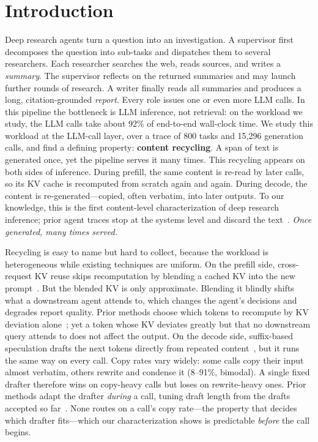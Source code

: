 \section{Introduction}

Deep research agents turn a question into an investigation. A supervisor first decomposes the question into sub-tasks and dispatches them to several researchers. Each researcher searches the web, reads sources, and writes a \emph{summary}. The supervisor reflects on the returned summaries and may launch further rounds of research. A writer finally reads all summaries and produces a long, citation-grounded \emph{report}. Every role issues one or even more LLM calls. In this pipeline the bottleneck is LLM inference, not retrieval: on the workload we study, the LLM calls take about 92\% of end-to-end wall-clock time. We study this workload at the LLM-call layer, over a trace of 800 tasks and 15,296 generation calls, and find a defining property: \textbf{content recycling}. A span of text is generated once, yet the pipeline serves it many times. This recycling appears on both sides of inference. During prefill, the same content is re-read by later calls, so its KV cache is recomputed from scratch again and again. During decode, the content is re-generated---copied, often verbatim, into later outputs. To our knowledge, this is the first content-level characterization of deep research inference; prior agent traces stop at the systems level and discard the text~\cite{tracelab}. \emph{Once generated, many times served.}

Recycling is easy to name but hard to collect, because the workload is heterogeneous while existing techniques are uniform. On the prefill side, cross-request KV reuse skips recomputation by blending a cached KV into the new prompt~\cite{cacheblend,kvcomm,droidspeak}. But the blended KV is only approximate. Blending it blindly shifts what a downstream agent attends to, which changes the agent's decisions and degrades report quality. Prior methods choose which tokens to recompute by KV deviation alone~\cite{cacheblend}; yet a token whose KV deviates greatly but that no downstream query attends to does not affect the output. On the decode side, suffix-based speculation drafts the next tokens directly from repeated content~\cite{suffixdecoding}, but it runs the same way on every call. Copy rates vary widely: some calls copy their input almost verbatim, others rewrite and condense it (8--91\%, bimodal). A single fixed drafter therefore wins on copy-heavy calls but loses on rewrite-heavy ones. Prior methods adapt the drafter \emph{during} a call, tuning draft length from the drafts accepted so far~\cite{specdecpp,banditspec}. None routes on a call's copy rate---the property that decides which drafter fits---which our characterization shows is predictable \emph{before} the call begins.


